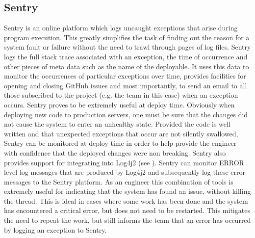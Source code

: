 \subsection{Sentry}
Sentry \cite{sentry} is an online platform which logs uncaught exceptions that arise during program execution. This greatly simplifies the task of finding out the reason for a system fault or failure without the need to trawl through pages of log files. Sentry logs the full stack trace associated with an exception, the time of occurrence and other pieces of meta data such as the name of the deployable. It uses this data to monitor the occurrences of particular exceptions over time, provides facilities for opening and closing GitHub issues and most importantly, to send an email to all those subscribed to the project (e.g. the \team{} team in this case) when an exception occurs. Sentry proves to be extremely useful at deploy time. Obviously when deploying new code to production servers, one must be sure that the changes did not cause the system to enter an unhealthy state. Provided the code is well written and that unexpected exceptions that occur are not silently swallowed, Sentry can be monitored at deploy time in order to help provide the engineer with confidence that the deployed changes were non breaking. Sentry also provides support for integrating into Log4j2 (see ). Sentry can monitor ERROR level log messages that are produced by Log4j2 and subsequently log these error messages to the Sentry platform. As an engineer this combination of tools is extremely useful for indicating that the system has found an issue, without killing the thread. This is ideal in cases where some work has been done and the system has encountered a critical error, but does not need to be restarted. This mitigates the need to repeat the work, but still informs the team that an error has occurred by logging an exception to Sentry.


